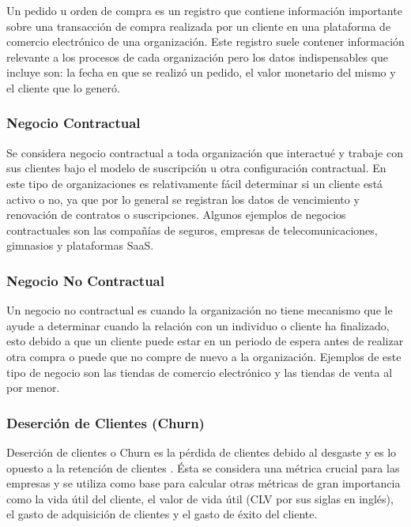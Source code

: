 Un pedido u orden de compra es un registro que contiene información importante sobre una transacción de compra realizada por un cliente en una plataforma de comercio electrónico de una organización. Este registro suele contener información relevante a los procesos de cada organización pero los datos indispensables que incluye son: la fecha en que se realizó un pedido, el valor monetario del mismo y el cliente que lo generó.

\subsubsection{Negocio Contractual}

Se considera negocio contractual a toda organización que interactué y trabaje con sus clientes bajo el modelo de suscripción u otra configuración contractual. En este tipo de organizaciones es relativamente fácil determinar si un cliente está activo o no, ya que por lo general se registran los datos de vencimiento y renovación de contratos o suscripciones. Algunos ejemplos de negocios contractuales son las compañías de seguros, empresas de telecomunicaciones, gimnasios y plataformas SaaS.

\subsubsection{Negocio No Contractual}

Un negocio no contractual es cuando la organización no tiene mecanismo que le ayude a determinar cuando la relación con un individuo o cliente ha finalizado, esto debido a que un cliente puede estar en un periodo de espera antes de realizar otra compra o puede que no compre de nuevo a la organización. Ejemplos de este tipo de negocio son las tiendas de comercio electrónico y las tiendas de venta al por menor.

\subsubsection{Deserción de Clientes (Churn)}

Deserción de clientes o Churn es la pérdida de clientes debido al desgaste y es lo opuesto a la retención de clientes \cite{gold2020}. Ésta se considera una métrica crucial para las empresas y se utiliza como base para calcular otras métricas de gran importancia como la vida útil del cliente, el valor de vida útil (CLV por sus siglas en inglés), el gasto de adquisición de clientes y el gasto de éxito del cliente.

